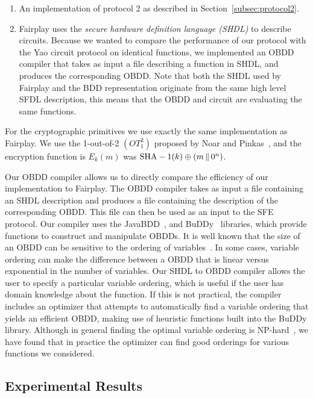 \begin{enumerate}
\item An implementation of  protocol 2
as described in Section~\ref{subsec:protocol2}.

\item Fairplay uses the {\it secure hardware definition language (SHDL)} to
describe circuits. Because we wanted to compare the performance of our
protocol with the Yao circuit protocol on identical functions, 
we implemented an OBDD compiler 
that takes as input a file
describing a function in SHDL, and produces the corresponding OBDD.
Note that both the SHDL used by Fairplay and the BDD representation
originate from the same high level SFDL description, this means that
the OBDD and circuit are evaluating the same functions.
\end{enumerate}

For the cryptographic primitives we use exactly the same
implementation as Fairplay. We use the 1-out-of-2 $(OT^{2}_{1})$
proposed by Noar and Pinkas~\cite{Noar-Pinkas:2001}, and  the encryption
function is $E_k (m)$ was ${\rm SHA-1}(k) \oplus (m \,\|\,0^n)$.


Our OBDD compiler allows us to directly compare the efficiency of our
implementation to Fairplay. The OBDD compiler takes as input a file
containing an SHDL description and produces a file containing the
description of the corresponding OBDD. This file can then be used as
an input to the SFE protocol. Our compiler uses the
JavaBDD~\cite{JavaBDD}, and BuDDy~\cite{BuDDy} libraries, which
provide functions to construct and manipulate OBDDs. It is well known
that the size of an OBDD can be sensitive to the ordering of
variables~\cite{Bryant:BDD}. In some cases, variable ordering can make
the difference between a OBDD that is linear versus exponential in the
number of variables. Our SHDL to OBDD compiler allows the user to
specify a particular variable ordering, which is useful if the user
has domain knowledge about the function. If this is not practical, the
compiler includes an optimizer that attempts to automatically find a
variable ordering that yields an efficient OBDD, making use of
heuristic functions built into the BuDDy library. Although in general
finding the optimal variable ordering is
NP-hard~\cite{Bollig-Wegener:1996}, we have found that in practice the
optimizer can find good orderings for various functions we considered.


\subsection{Experimental Results}

